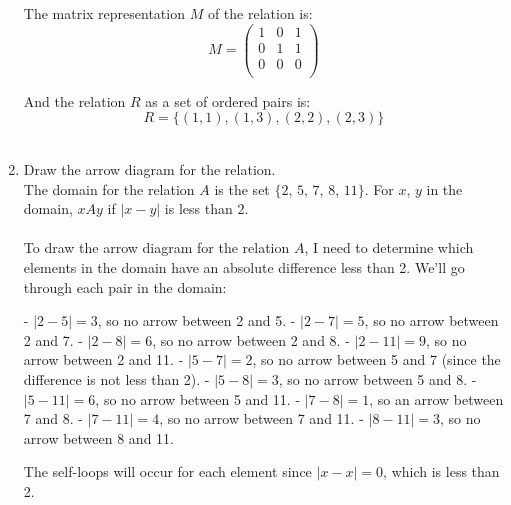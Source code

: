 \documentclass{amsart}
\theoremstyle{definition}
\theoremstyle{Exercise}
\theoremstyle{remark}
\theoremstyle{rule}
\numberwithin{equation}{section}
\begin{document}
\begin{enumerate}[label=(\alph*)]
The matrix representation \( M \) of the relation is:
\[
M = \begin{pmatrix}
1 & 0 & 1 \\
0 & 1 & 1 \\
0 & 0 & 0 \\
\end{pmatrix}
\]

And the relation \( R \) as a set of ordered pairs is:
\[ R = \{(1,1), (1,3), (2,2), (2,3)\} \]
\\

\item Draw the arrow diagram for the relation.\\
 The domain for the relation $A$ is the set $\{2,\, 5,\, 7,\, 8,\, 11\}$. For $x$, $y$ in the domain, $xAy$ if $|x-y|$ is less than $2$.
\\\\
To draw the arrow diagram for the relation \( A \), I  need to determine which elements in the domain have an absolute difference less than 2. We'll go through each pair in the domain:

- \( |2 - 5| = 3 \), so no arrow between 2 and 5.
- \( |2 - 7| = 5 \), so no arrow between 2 and 7.
- \( |2 - 8| = 6 \), so no arrow between 2 and 8.
- \( |2 - 11| = 9 \), so no arrow between 2 and 11.
- \( |5 - 7| = 2 \), so no arrow between 5 and 7 (since the difference is not less than 2).
- \( |5 - 8| = 3 \), so no arrow between 5 and 8.
- \( |5 - 11| = 6 \), so no arrow between 5 and 11.
- \( |7 - 8| = 1 \), so an arrow between 7 and 8.
- \( |7 - 11| = 4 \), so no arrow between 7 and 11.
- \( |8 - 11| = 3 \), so no arrow between 8 and 11.

The self-loops will occur for each element since \( |x - x| = 0 \), which is less than 2.
\end{enumerate}
 \newpage
\end{document}
